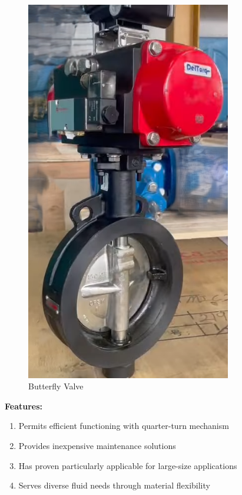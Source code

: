 \begin{figure}[h]
    \centering
    \includegraphics[width=0.8\textwidth,height=0.33\textheight,keepaspectratio]{figs/valves/butterfly.png}
    \caption{Butterfly Valve}
    \label{fig:butterfly_valve}
\end{figure}

\textbf{Features:}
\begin{enumerate}
    \item Permits efficient functioning with quarter-turn mechanism
    \item Provides inexpensive maintenance solutions
    \item Has proven particularly applicable for large-size applications
    \item Serves diverse fluid needs through material flexibility
\end{enumerate}

